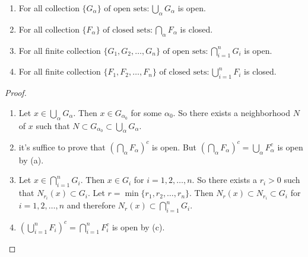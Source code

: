 \begin{thm}[24]
	\hfill
	\begin{enumerate}[label=(\alph*)]
		\item For all collection $\{G_{\alpha}\} \text{ of open sets}:\bigcup_{\alpha} G_{\alpha}$ is open.
		\item For all collection $\{F_{\alpha}\} \text{ of closed sets}:\bigcap_{\alpha} F_{\alpha}$ is closed.
		\item For all finite collection $\{G_{1},G_{2},\ldots,G_{n}\} \text{ of open sets}:\bigcap_{i=1}^{n} G_{i}$ is open.
		\item For all finite collection $\{F_{1},F_{2},\ldots,F_{n}\} \text{ of closed sets}:\bigcup_{i=1}^{n} F_{i}$ is closed.
	\end{enumerate}

	\begin{proof}
		\begin{enumerate}[label=(\alph*)]
			\item Let $x \in \bigcup_{\alpha}G_{\alpha}$. Then $x \in G_{\alpha_0}$ for some $\alpha_0$. So there exists a neighborhood $N$ of $x$ such that $N \subset G_{\alpha_0} \subset \bigcup_{\alpha}G_{\alpha}$.
			\item it's suffice to prove that $(\bigcap_{\alpha} F_{\alpha})^{c}$ is open. But $(\bigcap_{\alpha} F_{\alpha})^{c}=\bigcup_{\alpha} F_{\alpha}^{c}$ is open by (a).
			\item Let $x \in \bigcap_{i=1}^{n} G_{i}$. Then $x \in G_{i}$ for $i=1,2,\ldots,n$. So there exists a $r_i>0$ such that $N_{r_i}(x) \subset G_i$. Let $r=\min \{r_1,r_2,\ldots, r_n\}$. Then $N_r(x) \subset N_{r_i} \subset G_i$ for $i=1,2,\ldots,n$ and therefore $N_r(x) \subset \bigcap_{i=1}^{n} G_{i}$.
			\item  $(\bigcup_{i=1}^{n} F_{i})^{c}=\bigcap_{i=1}^{n} F_{i}^{c}$ is open by (c).
		\end{enumerate}
	\end{proof}
\end{thm}

